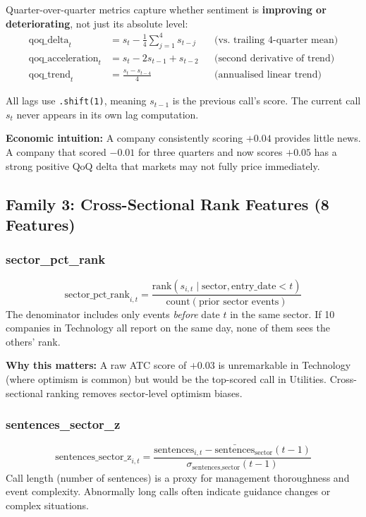 \documentclass[11pt,a4paper]{article}
\begin{document}
Quarter-over-quarter metrics capture whether sentiment is \textbf{improving or deteriorating}, not just its absolute level:
\begin{align}
\text{qoq\_delta}_t &= s_t - \frac{1}{4}\sum_{j=1}^{4} s_{t-j} && \text{(vs. trailing 4-quarter mean)}\\[4pt]
\text{qoq\_acceleration}_t &= s_t - 2s_{t-1} + s_{t-2} && \text{(second derivative of trend)}\\[4pt]
\text{qoq\_trend}_t &= \frac{s_t - s_{t-4}}{4} && \text{(annualised linear trend)}
\end{align}

All lags use \texttt{.shift(1)}, meaning $s_{t-1}$ is the previous call's score. The current call $s_t$ never appears in its own lag computation.

\textbf{Economic intuition:} A company consistently scoring $+0.04$ provides little news. A company that scored $-0.01$ for three quarters and now scores $+0.05$ has a strong positive QoQ delta that markets may not fully price immediately.

\subsection{Family 3: Cross-Sectional Rank Features (8 Features)}

\subsubsection{sector\_pct\_rank}
\[
\text{sector\_pct\_rank}_{i,t} = \frac{\text{rank}(s_{i,t} \mid \text{sector}, \text{entry\_date} < t)}{\text{count}(\text{prior sector events})}
\]
The denominator includes only events \emph{before} date $t$ in the same sector. If 10 companies in Technology all report on the same day, none of them sees the others' rank.

\textbf{Why this matters:} A raw ATC score of $+0.03$ is unremarkable in Technology (where optimism is common) but would be the top-scored call in Utilities. Cross-sectional ranking removes sector-level optimism biases.

\subsubsection{sentences\_sector\_z}
\[
\text{sentences\_sector\_z}_{i,t} = \frac{\text{sentences}_{i,t} - \bar{\text{sentences}}_\text{sector}(t-1)}{\sigma_\text{sentences,sector}(t-1)}
\]
Call length (number of sentences) is a proxy for management thoroughness and event complexity. Abnormally long calls often indicate guidance changes or complex situations.
\end{document}
